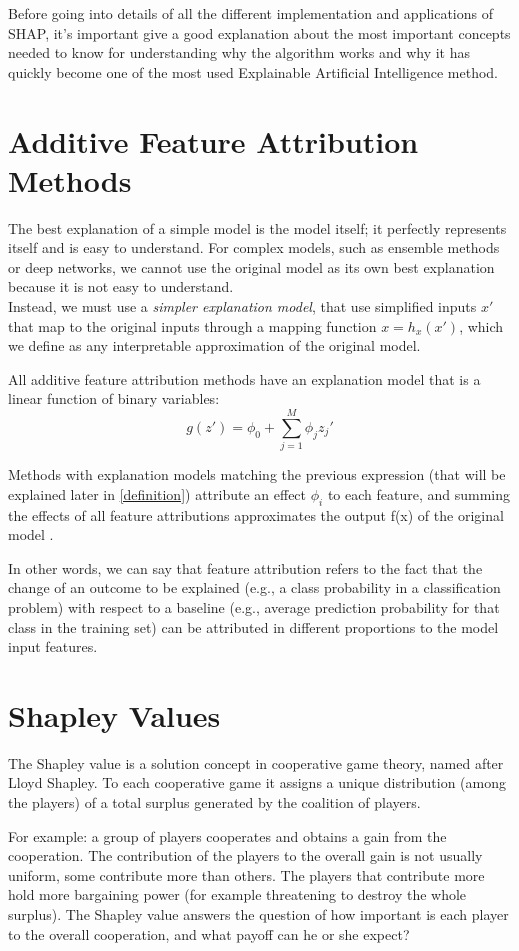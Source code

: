 Before going into details of all the different implementation and applications of SHAP, it's important give a good explanation about the most important concepts needed to know for understanding why the algorithm works and why it has quickly become one of the most used Explainable Artificial Intelligence method.
\section{Additive Feature Attribution Methods}
The best explanation of a simple model is the model itself; it perfectly represents itself and is easy to understand. For complex models, such as ensemble methods or deep networks, we cannot use the original model as its own best explanation because it is not easy to understand.\\
Instead, we must use a \textit{simpler explanation model}, that use simplified inputs $x'$ that map to the original inputs through a mapping function $x = h_{x}(x')$, which we define as any interpretable approximation of the original model.

All additive feature attribution methods have an explanation model that is a linear function of binary variables:
$$g(z')=\phi_0+\sum_{j=1}^M\phi_jz_j'$$

Methods with explanation models matching the previous expression (that will be explained later in \autoref{definition}) attribute an effect $\phi_i$ to each feature, and summing the effects of all feature attributions approximates the output f(x) of the original model \cite{Interpreting-Model-Predictions}.

In other words, we can say that feature attribution refers to the fact that the change of an outcome to be explained (e.g., a class probability in a classification problem) with respect to a baseline (e.g., average prediction probability for that class in the training set) can be attributed in different proportions to the model input features.


\section{Shapley Values}

The Shapley value is a solution concept in cooperative game theory, named after Lloyd Shapley. To each cooperative game it assigns a unique distribution (among the players) of a total surplus generated by the coalition of players.

For example: a group of players cooperates and obtains a gain from the cooperation. The contribution of the players to the overall gain is not usually uniform, some contribute more than others. The players that contribute more hold more bargaining power (for example threatening to destroy the whole surplus). The Shapley value answers the question of how important is each player to the overall cooperation, and what payoff can he or she expect?

